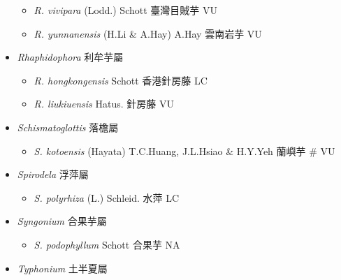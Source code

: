 \begin{itemize}
  \begin{itemize}
        \item[] \textit{R. vivipara} (Lodd.) Schott  臺灣目賊芋   VU
        \item[] \textit{R. yunnanensis} (H.Li \& A.Hay) A.Hay  雲南岩芋   VU
  \end{itemize}
 \item[] \textit{Rhaphidophora} 利牟芋屬
                                
  \begin{itemize}
        \item[] \textit{R. hongkongensis} Schott  香港針房藤   LC
        \item[] \textit{R. liukiuensis} Hatus.  針房藤   VU
  \end{itemize}
 \item[] \textit{Schismatoglottis} 落檐屬
                                
  \begin{itemize}
        \item[] \textit{S. kotoensis} (Hayata) T.C.Huang, J.L.Hsiao \& H.Y.Yeh  蘭嶼芋  \# VU
  \end{itemize}
 \item[] \textit{Spirodela} 浮萍屬
                                
  \begin{itemize}
        \item[] \textit{S. polyrhiza} (L.) Schleid.  水萍   LC
  \end{itemize}
 \item[] \textit{Syngonium} 合果芋屬
                                
  \begin{itemize}
        \item[] \textit{S. podophyllum} Schott  合果芋   NA
  \end{itemize}
 \item[] \textit{Typhonium} 土半夏屬
                                

\end{itemize}

